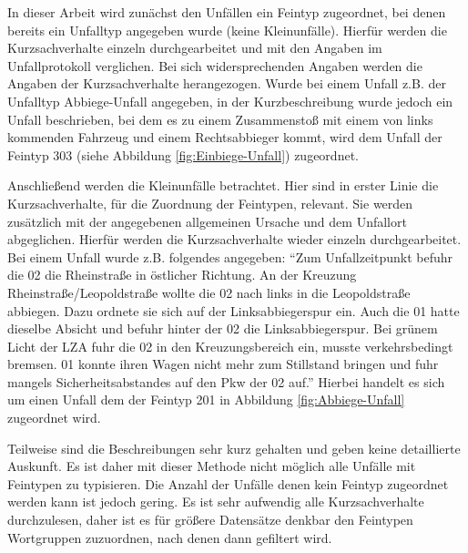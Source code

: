 In dieser Arbeit wird zunächst den Unfällen ein Feintyp zugeordnet, bei denen bereits ein Unfalltyp angegeben wurde (keine Kleinunfälle). Hierfür werden die Kurzsachverhalte einzeln durchgearbeitet und mit den Angaben im Unfallprotokoll verglichen. Bei sich widersprechenden Angaben werden die Angaben der Kurzsachverhalte herangezogen. Wurde bei einem Unfall z.B. der Unfalltyp Abbiege-Unfall angegeben, in der Kurzbeschreibung wurde jedoch ein Unfall beschrieben, bei dem es zu einem Zusammenstoß mit einem von links kommenden Fahrzeug und einem Rechtsabbieger kommt, wird dem Unfall der Feintyp 303 (siehe Abbildung \ref{fig:Einbiege-Unfall}) zugeordnet.

Anschließend werden die Kleinunfälle betrachtet. Hier sind in erster Linie die Kurzsachverhalte, für die Zuordnung der Feintypen, relevant. Sie werden zusätzlich mit der angegebenen allgemeinen Ursache und dem Unfallort abgeglichen. Hierfür werden die Kurzsachverhalte wieder einzeln durchgearbeitet. Bei einem Unfall wurde z.B. folgendes angegeben: \enquote{Zum Unfallzeitpunkt befuhr die 02 die Rheinstraße in östlicher Richtung. An der Kreuzung Rheinstraße/Leopoldstraße wollte die 02 nach links in die Leopoldstraße abbiegen. Dazu ordnete sie sich auf der Linksabbiegerspur ein. Auch die 01 hatte dieselbe Absicht und befuhr hinter der 02 die Linksabbiegerspur. Bei grünem Licht der LZA fuhr die 02 in den Kreuzungsbereich ein, musste verkehrsbedingt bremsen. 01 konnte ihren Wagen nicht mehr zum Stillstand bringen und fuhr mangels Sicherheitsabstandes auf den Pkw der 02 auf.} Hierbei handelt es sich um einen Unfall dem der Feintyp 201 in Abbildung \ref{fig:Abbiege-Unfall} zugeordnet wird.

Teilweise sind die Beschreibungen sehr kurz gehalten und geben keine detaillierte Auskunft. Es ist daher mit dieser Methode nicht möglich alle Unfälle mit Feintypen zu typisieren. Die Anzahl der Unfälle denen kein Feintyp zugeordnet werden kann ist jedoch gering. Es ist sehr aufwendig alle Kurzsachverhalte durchzulesen, daher ist es für größere Datensätze denkbar den Feintypen Wortgruppen zuzuordnen, nach denen dann gefiltert wird. %

